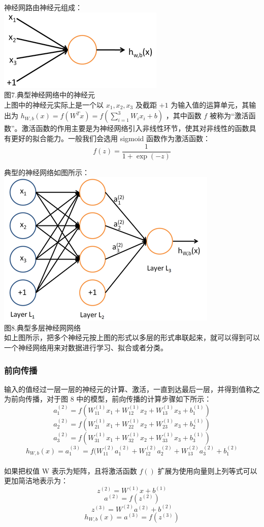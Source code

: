 神经网路由神经元组成：\\\includegraphics{picture/single-neuron.png}\\图7.典型神经网络中的神经元\\上图中的神经元实际上是一个以
\(x_1, x_2, x_3\) 及截距 \(+1\) 为输入值的运算单元，其输出为
\(h_{W,b}(x) = f(W^Tx) = f(\sum_{i=1}^3 W_{i}x_i +b)\) ，其中函数 \(f\)
被称为``激活函数''。激活函数的作用主要是为神经网络引入非线性环节，使其对非线性的函数具有更好的拟合能力。一般我们会选用
sigmoid 函数作为激活函数：\\\[f(z) = \frac{1}{1+\exp(-z)}\]

典型的神经网络如图所示：\\\includegraphics{picture/MLP.png}\\图8.典型多层神经网网络\\如上图所示，把多个神经元按上图的形式以多层的形式串联起来，就可以得到可以一个神经网络用来对数据进行学习、拟合或者分类。

\subsubsection{前向传播}\label{ux524dux5411ux4f20ux64ad}

输入的值经过一层一层的神经元的计算、激活，一直到达最后一层，并得到值称之为前向传播，对于图
8
中的模型，前向传播的计算步骤如下所示：\\\[ a_1^{(2)} = f(W_{11}^{(1)}x_1 + W_{12}^{(1)} x_2 + W_{13}^{(1)} x_3 + b_1^{(1)})\]
\[ a_2^{(2)} = f(W_{21}^{(1)}x_1 + W_{22}^{(1)} x_2 + W_{23}^{(1)} x_3 + b_2^{(1)})\]
\[ a_3^{(2)} = f(W_{31}^{(1)}x_1 + W_{32}^{(1)} x_2 + W_{33}^{(1)} x_3 + b_3^{(1)})\]
\[ h_{W,b}(x) = a_1^{(3)} =  f(W_{11}^{(2)}a_1^{(2)} + W_{12}^{(2)} a_2^{(2)} + W_{13}^{(2)} a_3^{(2)} + b_1^{(2)}\]\\如果把权值
W 表示为矩阵，且将激活函数 \(f()\)
扩展为使用向量则上列等式可以更加简洁地表示为：\\\[z^{(2)} = W^{(1)}x + b^{(1)}\]
\[a^{(2)} = f(z^{(2)})\] \[z^{(3)} = W^{(2)} a^{(2)} + b^{(2)}\]
\[h_{W,b}(x) = a^{(3)} = f(z^{(3)})\]


